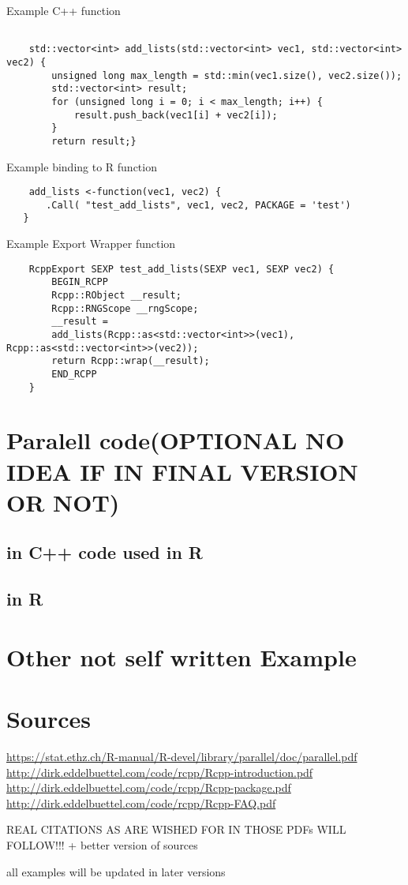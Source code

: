 \documentclass{article}
\begin{document}
        Example C++ function
            \begin{verbatim}

    std::vector<int> add_lists(std::vector<int> vec1, std::vector<int> vec2) {
        unsigned long max_length = std::min(vec1.size(), vec2.size());
        std::vector<int> result;
        for (unsigned long i = 0; i < max_length; i++) {
            result.push_back(vec1[i] + vec2[i]);
        }
        return result;}

            \end{verbatim}
        Example binding to R function
            \begin{verbatim}
    add_lists <-function(vec1, vec2) {
       .Call( "test_add_lists", vec1, vec2, PACKAGE = 'test')
   }
            \end{verbatim}
        Example Export Wrapper function
            \begin{verbatim}
    RcppExport SEXP test_add_lists(SEXP vec1, SEXP vec2) {
        BEGIN_RCPP
        Rcpp::RObject __result;
        Rcpp::RNGScope __rngScope;
        __result =
        add_lists(Rcpp::as<std::vector<int>>(vec1), Rcpp::as<std::vector<int>>(vec2));
        return Rcpp::wrap(__result);
        END_RCPP
    }
            \end{verbatim}

    \section{Paralell code(OPTIONAL NO IDEA IF IN FINAL VERSION OR NOT)}
        \subsection{in C++ code used in R}
        \subsection{in R}

    \section{Other not self written Example}
        
    \section{Sources}
    \url{https://stat.ethz.ch/R-manual/R-devel/library/parallel/doc/parallel.pdf}
        \newline
        \url{http://dirk.eddelbuettel.com/code/rcpp/Rcpp-introduction.pdf}
        \newline
    \url{http://dirk.eddelbuettel.com/code/rcpp/Rcpp-package.pdf}
        \newline
    \url{http://dirk.eddelbuettel.com/code/rcpp/Rcpp-FAQ.pdf}
        \newline

REAL CITATIONS AS ARE WISHED FOR IN THOSE PDFs WILL FOLLOW!!! + better version of sources

all examples will be updated in later versions
\end{document}
